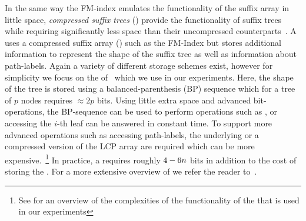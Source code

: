 In the same way the FM-index emulates the functionality of the suffix array in
little space, {\it compressed suffix trees} (\CST) provide the functionality
of suffix trees while requiring significantly less space than their uncompressed
counterparts~\cite{ofg-spire10}. A \CST uses a compressed suffix array (\CSA) such
as the FM-Index but stores additional information to represent the shape of
the suffix tree as well as information about path-labels. Again a variety
of different storage schemes exist, however for simplicity we focus on
the \CST of~ which we use in our experiments. Here, the 
shape of the tree is stored using a balanced-parenthesis (BP) sequence which 
for a tree of $p$ nodes requires $\approx 2p$ bits. Using little extra space
and advanced bit-operations, the BP-sequence can be used to perform 
operations such as ,  or 
accessing the $i$-th leaf can be answered in constant time.
To support more advanced operations such as accessing path-labels,
the underlying \CSA or a compressed version of the LCP array are required
which can be more expensive.~\footnote{See \supp for an overview of the complexities
of the functionality of the \CST that is used in our experiments} 
In practice, a \CST requires roughly $4-6n$ bits in addition to the
cost of storing the \CSA. For a more extensive overview of \CSTs we refer
the reader to~.